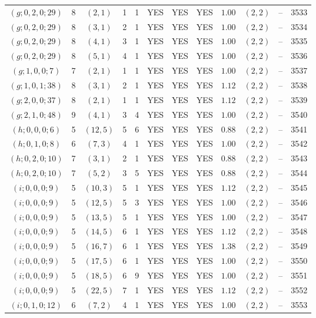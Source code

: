 \begin{longtable}{|c|c|c|c|c|c|c|c|c|c|c|c|}
$(g;0,2,0;29)$ & 8 & $(2,1)$ & 1 & 1 & YES & YES & YES & $1.00$ & $(2,2)$ & -- & 3533\\
$(g;0,2,0;29)$ & 8 & $(3,1)$ & 2 & 1 & YES & YES & YES & $1.00$ & $(2,2)$ & -- & 3534\\
$(g;0,2,0;29)$ & 8 & $(4,1)$ & 3 & 1 & YES & YES & YES & $1.00$ & $(2,2)$ & -- & 3535\\
$(g;0,2,0;29)$ & 8 & $(5,1)$ & 4 & 1 & YES & YES & YES & $1.00$ & $(2,2)$ & -- & 3536\\
$(g;1,0,0;7)$ & 7 & $(2,1)$ & 1 & 1 & YES & YES & YES & $1.00$ & $(2,2)$ & -- & 3537\\
$(g;1,0,1;38)$ & 8 & $(3,1)$ & 2 & 1 & YES & YES & YES & $1.12$ & $(2,2)$ & -- & 3538\\
$(g;2,0,0;37)$ & 8 & $(2,1)$ & 1 & 1 & YES & YES & YES & $1.12$ & $(2,2)$ & -- & 3539\\
$(g;2,1,0;48)$ & 9 & $(4,1)$ & 3 & 4 & YES & YES & YES & $1.00$ & $(2,2)$ & -- & 3540\\
$(h;0,0,0;6)$ & 5 & $(12,5)$ & 5 & 6 & YES & YES & YES & $0.88$ & $(2,2)$ & -- & 3541\\
$(h;0,1,0;8)$ & 6 & $(7,3)$ & 4 & 1 & YES & YES & YES & $1.00$ & $(2,2)$ & -- & 3542\\
$(h;0,2,0;10)$ & 7 & $(3,1)$ & 2 & 1 & YES & YES & YES & $0.88$ & $(2,2)$ & -- & 3543\\
$(h;0,2,0;10)$ & 7 & $(5,2)$ & 3 & 5 & YES & YES & YES & $0.88$ & $(2,2)$ & -- & 3544\\
$(i;0,0,0;9)$ & 5 & $(10,3)$ & 5 & 1 & YES & YES & YES & $1.12$ & $(2,2)$ & -- & 3545\\
$(i;0,0,0;9)$ & 5 & $(12,5)$ & 5 & 3 & YES & YES & YES & $1.00$ & $(2,2)$ & -- & 3546\\
$(i;0,0,0;9)$ & 5 & $(13,5)$ & 5 & 1 & YES & YES & YES & $1.00$ & $(2,2)$ & -- & 3547\\
$(i;0,0,0;9)$ & 5 & $(14,5)$ & 6 & 1 & YES & YES & YES & $1.12$ & $(2,2)$ & -- & 3548\\
$(i;0,0,0;9)$ & 5 & $(16,7)$ & 6 & 1 & YES & YES & YES & $1.38$ & $(2,2)$ & -- & 3549\\
$(i;0,0,0;9)$ & 5 & $(17,5)$ & 6 & 1 & YES & YES & YES & $1.00$ & $(2,2)$ & -- & 3550\\
$(i;0,0,0;9)$ & 5 & $(18,5)$ & 6 & 9 & YES & YES & YES & $1.00$ & $(2,2)$ & -- & 3551\\
$(i;0,0,0;9)$ & 5 & $(22,5)$ & 7 & 1 & YES & YES & YES & $1.12$ & $(2,2)$ & -- & 3552\\
$(i;0,1,0;12)$ & 6 & $(7,2)$ & 4 & 1 & YES & YES & YES & $1.00$ & $(2,2)$ & -- & 3553\\

\end{longtable}
